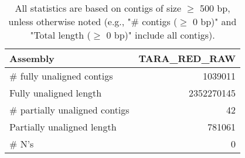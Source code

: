 \documentclass[12pt,a4paper]{article}
\begin{document}
\begin{table}[ht]
\begin{center}
\caption{All statistics are based on contigs of size $\geq$ 500 bp, unless otherwise noted (e.g., "\# contigs ($\geq$ 0 bp)" and "Total length ($\geq$ 0 bp)" include all contigs).}
\begin{tabular}{|l*{1}{|r}|}
\hline
Assembly & TARA\_RED\_RAW \\ \hline
\# fully unaligned contigs & 1039011 \\ \hline
Fully unaligned length & 2352270145 \\ \hline
\# partially unaligned contigs & 42 \\ \hline
Partially unaligned length & 781061 \\ \hline
\# N's & 0 \\ \hline
\end{tabular}
\end{center}
\end{table}
\end{document}
